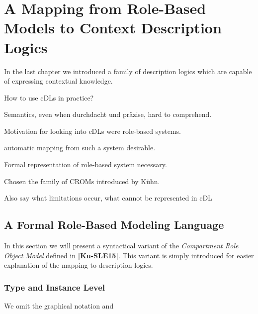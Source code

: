 
\chapter{A Mapping from Role-Based Models to Context Description Logics}
\label{cha:mapping}

In the last chapter we introduced a family of description logics which are capable of expressing
contextual knowledge. 

 

How to use cDLs in practice?

Semantics, even when durchdacht und präzise, hard to comprehend.

Motivation for looking into cDLs were role-based systems.

automatic mapping from such a system desirable.

Formal representation of role-based system necessary.

Chosen the family of CROMs introduced by Kühn.

Also say what limitations occur, what cannot be represented in cDL


\section{A Formal Role-Based Modeling Language}
\label{sec:sigma-crom}


In this section we will present a syntactical variant of the \emph{Compartment Role Object Model}
defined in \textbf{[Ku-SLE15]}. This variant is simply introduced for easier
explanation of the mapping to description logics.

\subsection{Type and Instance Level}
\label{sec:type-instance-level}

We omit the graphical notation and 




